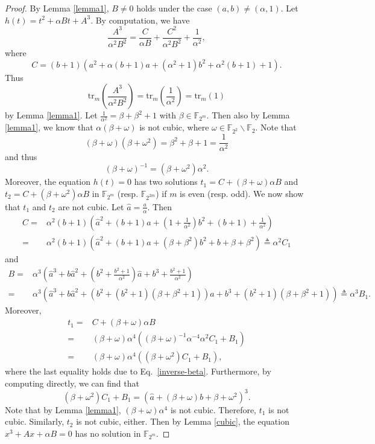 \documentclass{article}
\def\f2{{\mathbb F}_{2}}
\def\fm{{\mathbb F}_{2^m}}
\newcommand{\tr}{\mathrm{tr}}
\begin{document}
{\begin{proof}
By Lemma \ref{lemma1}, $B\neq0$ holds under the case $(a,b)\neq (\alpha,1)$.  Let $h(t) = t^2+ \alpha  Bt+A^3$. By computation, we have 
$$\frac{A^3}{\alpha^2 B^2} = \frac{C}{\alpha B}+\frac{C^2}{\alpha^2 B^2}+ \frac{1}{\alpha^2},$$
where $$C = (b+1)(a^2+ \alpha (b+1)a + (\alpha^2+1)b^2 + \alpha^2(b+1)+1).$$
Thus $$\tr_m\left( \frac{A^3}{ \alpha^2 B^2}\right) = \tr_m \left( \frac{1}{\alpha^2}\right)  = \tr_m(1)$$ by Lemma \ref{lemma1}.  
Let $ \frac{1}{\alpha^2} = \beta + \beta^2+1$ with $\beta \in\fm$. Then also by Lemma \ref{lemma1}, we know that $\alpha (\beta + \omega) $ is not cubic, where  $\omega\in \mathbb{F}_{2^2}\backslash\f2$. Note that $$(\beta+\omega)(\beta+\omega^2) = \beta^2+\beta+1 =\frac{1}{\alpha^2} $$ and thus 
\begin{equation}
	\label{inverse-beta}(\beta+\omega)^{-1} = (\beta+\omega^2) \alpha^2.
\end{equation}
Moreover, the equation $h(t)=0$ has two solutions $t_1= C+ (\beta + \omega)\alpha  B$ and  $t_2= C+(\beta + \omega^2)\alpha B$ in $\fm$ (resp. $\mathbb{F}_{2^{2m}}$) if $m$ is even (resp. odd). We now show that $t_1$ and $t_2$ are not cubic. Let $\hat{a}=\frac{a}{\alpha}$. Then 
\begin{align*}
	C =& \alpha^2 (b+1) (\hat{a}^2+(b+1)\hat{a} + (1+\frac{1}{\alpha^{2}}) b^2 + (b+1) + \frac{1}{\alpha^{2}} )\\
 =	& \alpha^2 (b+1) (\hat{a}^2 + (b+1)\hat{a} + (\beta+\beta^2) b^2 + b+\beta + \beta^2)  \triangleq \alpha^2 C_1
\end{align*}
and 
\begin{align*}
	B =& \alpha^3 (\hat{a}^3 + b \hat{a}^2 + ( b^2 +  \frac{b^2 +1}{\alpha^2}) \hat{a} + b^3+ \frac{b^2 +1}{\alpha^2}) \\ 
 =	&\alpha^3 (\hat{a}^3 + b \hat{a}^2 + ( b^2 +  (b^2 +1) (\beta+\beta^2+1) ) \hat{a} + b^3+ (b^2 +1) (\beta+\beta^2+1)) \triangleq \alpha^3 B_1.
\end{align*}
Moreover, 
\begin{align*}
	t_1 =&  C+ (\beta + \omega)\alpha  B \\
	=& (\beta + \omega)\alpha^4 \left( (\beta+\omega)^{-1}\alpha^{-4} \alpha^2 C_1 + B_1 \right) \\
	=& (\beta + \omega)\alpha^4 \left( (\beta+\omega^2) C_1 + B_1  \right),
\end{align*}
where the last equality holds due to Eq.\ \eqref{inverse-beta}. Furthermore, by computing directly, we can find that 
$$(\beta+\omega^2) C_1 + B_1  = (\hat{a} + (\beta + \omega) b + \beta + \omega^2)^3.$$ Note that by Lemma \ref{lemma1}, $(\beta + \omega)\alpha^4$ is not cubic. Therefore, $t_1$ is not cubic. Similarly, $t_2$ is not cubic, either. 
 Then by Lemma \ref{cubic},  the equation $x^3 + Ax + \alpha B = 0$ has no solution in $\fm$. 


\end{proof}}
\end{document}
